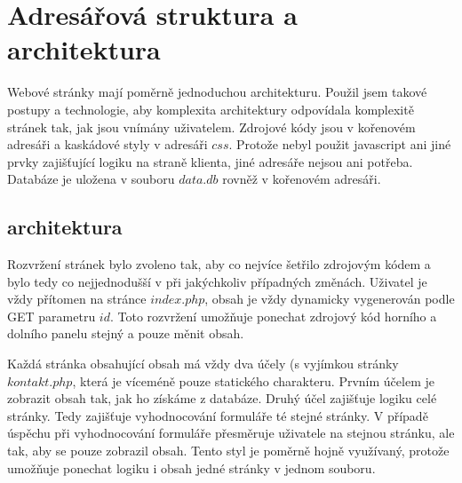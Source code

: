 \documentclass[12pt]{article}
\begin{document}
\section{Adresářová struktura a architektura}
Webové stránky mají poměrně jednoduchou architekturu. Použil jsem takové
postupy a technologie, aby komplexita architektury odpovídala komplexitě
stránek tak, jak jsou vnímány uživatelem. Zdrojové kódy jsou v kořenovém
adresáři a kaskádové styly v adresáři $css$. Protože nebyl použit javascript
ani jiné prvky zajišťující logiku na straně klienta, jiné adresáře nejsou ani
potřeba. Databáze je uložena v souboru $data.db$ rovněž v kořenovém adresáři.

\subsection{architektura}
Rozvržení stránek bylo zvoleno tak, aby co nejvíce šetřilo zdrojovým kódem
a bylo tedy co nejjednodušší v při jakýchkoliv případných změnách. Uživatel je
vždy přítomen na stránce $index.php$, obsah je vždy dynamicky vygenerován
podle GET parametru $id$. Toto rozvržení umožňuje ponechat zdrojový kód horního
a dolního panelu stejný a pouze měnit obsah.

Každá stránka obsahující obsah má vždy dva účely (s vyjímkou stránky
$kontakt.php$, která je víceméně pouze statického charakteru. Prvním účelem je
zobrazit obsah tak, jak ho získáme z databáze. Druhý účel zajišťuje logiku celé
stránky. Tedy zajišťuje vyhodnocování formuláře té stejné stránky. V případě
úspěchu při vyhodnocování formuláře přesměruje uživatele na stejnou stránku,
ale tak, aby se pouze zobrazil obsah. Tento styl je poměrně hojně využívaný,
protože umožňuje ponechat logiku i obsah jedné stránky v jednom souboru.
\end{document}
